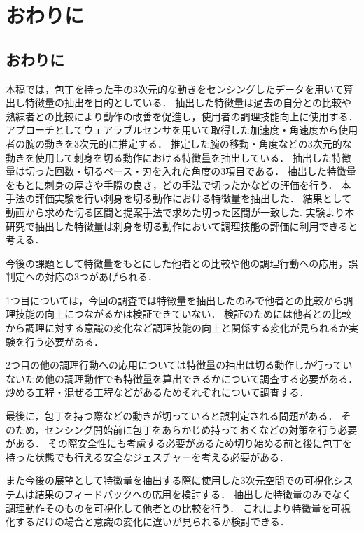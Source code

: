 \chapter{おわりに}
\section{おわりに}

本稿では，包丁を持った手の3次元的な動きをセンシングしたデータを用いて算出し特徴量の抽出を目的としている．
抽出した特徴量は過去の自分との比較や熟練者との比較により動作の改善を促進し，使用者の調理技能向上に使用する．
アプローチとしてウェアラブルセンサを用いて取得した加速度・角速度から使用者の腕の動きを3次元的に推定する．
推定した腕の移動・角度などの3次元的な動きを使用して刺身を切る動作における特徴量を抽出している．
抽出した特徴量は切った回数・切るペース・刃を入れた角度の3項目である．
抽出した特徴量をもとに刺身の厚さや手際の良さ，どの手法で切ったかなどの評価を行う．
本手法の評価実験を行い刺身を切る動作における特徴量を抽出した．
結果として動画から求めた切る区間と提案手法で求めた切った区間が一致した.
実験より本研究で抽出した特徴量は刺身を切る動作において調理技能の評価に利用できると考える．

今後の課題として特徴量をもとにした他者との比較や他の調理行動への応用，誤判定への対応の3つがあげられる．

1つ目については，今回の調査では特徴量を抽出したのみで他者との比較から調理技能の向上につながるかは検証できていない．
検証のためには他者との比較から調理に対する意識の変化など調理技能の向上と関係する変化が見られるか実験を行う必要がある．

2つ目の他の調理行動への応用については特徴量の抽出は切る動作しか行っていないため他の調理動作でも特徴量を算出できるかについて調査する必要がある．
炒める工程・混ぜる工程などがあるためそれぞれについて調査する．

最後に，包丁を持つ際などの動きが切っていると誤判定される問題がある．
そのため，センシング開始前に包丁をあらかじめ持っておくなどの対策を行う必要がある．
その際安全性にも考慮する必要があるため切り始める前と後に包丁を持った状態でも行える安全なジェスチャーを考える必要がある．

また今後の展望として特徴量を抽出する際に使用した3次元空間での可視化システムは結果のフィードバックへの応用を検討する．
抽出した特徴量のみでなく調理動作そのものを可視化して他者との比較を行う．
これにより特徴量を可視化するだけの場合と意識の変化に違いが見られるか検討できる．